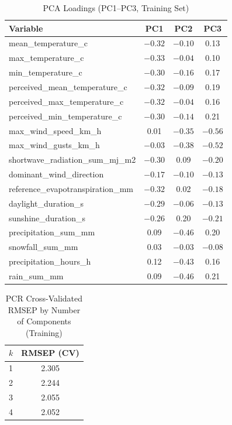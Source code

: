 \documentclass[
]{article}
\begin{document}
\begin{table}[!htbp]\centering
\caption{PCA Loadings (PC1--PC3, Training Set)}
\label{tab:A5}
\begin{tabular}{lccc}
\toprule
Variable & PC1 & PC2 & PC3 \\
\midrule
mean\_temperature\_c & $-0.32$ & $-0.10$ & 0.13 \\
max\_temperature\_c & $-0.33$ & $-0.04$ & 0.10 \\
min\_temperature\_c & $-0.30$ & $-0.16$ & 0.17 \\
perceived\_mean\_temperature\_c & $-0.32$ & $-0.09$ & 0.19 \\
perceived\_max\_temperature\_c & $-0.32$ & $-0.04$ & 0.16 \\
perceived\_min\_temperature\_c & $-0.30$ & $-0.14$ & 0.21 \\
max\_wind\_speed\_km\_h & 0.01 & $-0.35$ & $-0.56$ \\
max\_wind\_gusts\_km\_h & $-0.03$ & $-0.38$ & $-0.52$ \\
shortwave\_radiation\_sum\_mj\_m2 & $-0.30$ & 0.09 & $-0.20$ \\
dominant\_wind\_direction & $-0.17$ & $-0.10$ & $-0.13$ \\
reference\_evapotranspiration\_mm & $-0.32$ & 0.02 & $-0.18$ \\
daylight\_duration\_s & $-0.29$ & $-0.06$ & $-0.13$ \\
sunshine\_duration\_s & $-0.26$ & 0.20 & $-0.21$ \\
precipitation\_sum\_mm & 0.09 & $-0.46$ & 0.20 \\
snowfall\_sum\_mm & 0.03 & $-0.03$ & $-0.08$ \\
precipitation\_hours\_h & 0.12 & $-0.43$ & 0.16 \\
rain\_sum\_mm & 0.09 & $-0.46$ & 0.21 \\
\bottomrule
\end{tabular}
\end{table}

\begin{table}[!htbp]\centering
\caption{PCR Cross-Validated RMSEP by Number of Components (Training)}
\label{tab:A6}
\begin{tabular}{lc}
\toprule
$k$ & RMSEP (CV) \\
\midrule
1 & 2.305 \\
2 & 2.244 \\
3 & 2.055 \\
4 & 2.052 \\
\bottomrule
\end{tabular}
\end{table}
\end{document}

